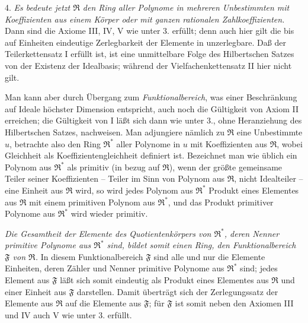\documentclass[11pt]{article}
\providecommand{\mR}{\mathfrak{R}}
\providecommand{\mF}{\mathfrak{F}}
\begin{document}
4. \emph{Es bedeute jetzt $\mR$ den Ring aller Polynome in mehreren Unbestimmten mit Koeffizienten aus einem Körper oder mit ganzen rationalen Zahlkoeffizienten.} Dann sind die Axiome III, IV, V wie unter 3. erfüllt; denn auch hier gilt die bis auf Einheiten eindeutige Zerlegbarkeit der Elemente in unzerlegbare. Daß der Teilerkettensatz I erfüllt ist, ist eine unmittelbare Folge des Hilbertschen Satzes von der Existenz der Idealbasis; während der Vielfachenkettensatz II hier nicht gilt.

Man kann aber durch Übergang zum \emph{Funktionalbereich}, was einer Beschränkung auf Ideale höchster Dimension entspricht, auch noch die Gültigkeit von Axiom II erreichen; die Gültigkeit von I läßt sich dann wie unter 3., ohne Heranziehung des Hilbertschen Satzes, nachweisen. Man adjungiere nämlich zu $\mR$ eine Unbestimmte $u$, betrachte also den Ring $\mR^*$ aller Polynome in $u$ mit Koeffizienten aus $\mR$, wobei Gleichheit als Koeffizientengleichheit definiert ist. Bezeichnet man wie üblich ein Polynom aus $\mR^*$ als primitiv (in bezug auf $\mR$), wenn der größte gemeinsame Teiler seiner Koeffizienten -- Teiler im Sinn von Polynom aus $\mR$, nicht Idealteiler -- eine Einheit aus $\mR$ wird, so wird jedes Polynom aus $\mR^*$ Produkt eines Elementes aus $\mR$ mit einem primitiven Polynom aus $\mR^*$, und das Produkt primitiver Polynome aus $\mR^*$ wird wieder primitiv.

\emph{Die Gesamtheit der Elemente des Quotientenkörpers von $\mR^*$, deren Nenner primitive Polynome aus $\mR^*$ sind, bildet somit einen Ring, den Funktionalbereich $\mF$ von $\mR$.} In diesem Funktionalbereich $\mF$ sind alle und nur die Elemente Einheiten, deren Zähler und Nenner primitive Polynome aus $\mR^*$ sind; jedes Element aus $\mF$ läßt sich somit eindeutig als Produkt eines Elementes aus $\mR$ und einer Einheit aus $\mF$ darstellen. Damit überträgt sich der Zerlegungssatz der Elemente aus $\mR$ auf die Elemente aus $\mF$; für $\mF$ ist somit neben den Axiomen III und IV auch V wie unter 3. erfüllt.
\end{document}
